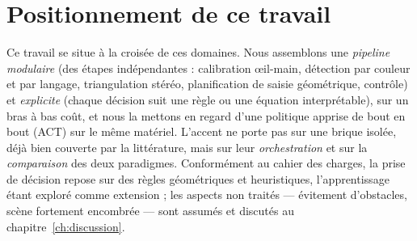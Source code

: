 
\section{Positionnement de ce travail}

Ce travail se situe à la croisée de ces domaines. Nous assemblons une \emph{pipeline modulaire} (des étapes indépendantes : calibration œil-main, détection par couleur et par langage, triangulation stéréo, planification de saisie géométrique, contrôle) et \emph{explicite} (chaque décision suit une règle ou une équation interprétable), sur un bras à bas coût, et nous la mettons en regard d'une politique apprise de bout en bout (ACT) sur le même matériel. L'accent ne porte pas sur une brique isolée, déjà bien couverte par la littérature, mais sur leur \emph{orchestration} et sur la \emph{comparaison} des deux paradigmes. Conformément au cahier des charges, la prise de décision repose sur des règles géométriques et heuristiques, l'apprentissage étant exploré comme extension ; les aspects non traités --- évitement d'obstacles, scène fortement encombrée --- sont assumés et discutés au chapitre~\ref{ch:discussion}.
